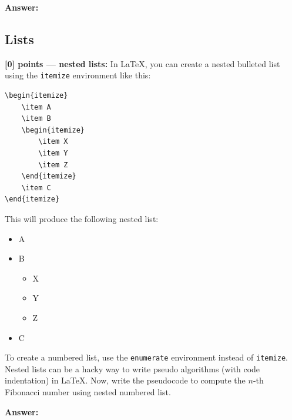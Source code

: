 \documentclass{article}
\begin{document}
\begin{tcolorbox}
\textbf{Answer: }


\end{tcolorbox}


\subsection{Lists}


\noindent\textbf{[0] points --- nested lists:} In LaTeX, you can create a nested bulleted list using the \verb|itemize| environment like this:

\begin{verbatim}
\begin{itemize}
    \item A
    \item B
    \begin{itemize}
        \item X
        \item Y
        \item Z
    \end{itemize}
    \item C
\end{itemize}
\end{verbatim}

This will produce the following nested list:

\begin{itemize}
    \item A
    \item B
    \begin{itemize}
        \item X
        \item Y
        \item Z
    \end{itemize}
    \item C
\end{itemize}

To create a numbered list, use the \verb|enumerate| environment instead of \verb|itemize|.
Nested lists can be a hacky way to write pseudo algorithms (with code indentation) in LaTeX. Now, write the pseudocode to compute the $n$-th Fibonacci number using nested numbered list.

\begin{tcolorbox}
\textbf{Answer: }


\end{tcolorbox}
\end{document}
